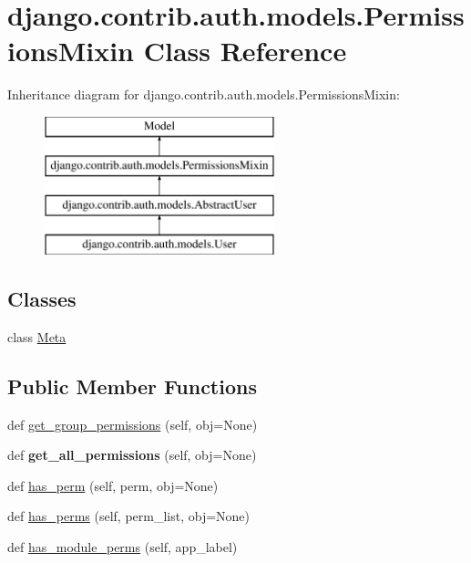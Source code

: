 \hypertarget{classdjango_1_1contrib_1_1auth_1_1models_1_1_permissions_mixin}{}\section{django.\+contrib.\+auth.\+models.\+Permissions\+Mixin Class Reference}
\label{classdjango_1_1contrib_1_1auth_1_1models_1_1_permissions_mixin}
Inheritance diagram for django.\+contrib.\+auth.\+models.\+Permissions\+Mixin\+:\begin{figure}[H]
\begin{center}
\leavevmode
\includegraphics[height=4.000000cm]{classdjango_1_1contrib_1_1auth_1_1models_1_1_permissions_mixin}
\end{center}
\end{figure}
\subsection*{Classes}
\begin{DoxyCompactItemize}
\item 
class \mbox{\hyperlink{classdjango_1_1contrib_1_1auth_1_1models_1_1_permissions_mixin_1_1_meta}{Meta}}
\end{DoxyCompactItemize}
\subsection*{Public Member Functions}
\begin{DoxyCompactItemize}
\item 
def \mbox{\hyperlink{classdjango_1_1contrib_1_1auth_1_1models_1_1_permissions_mixin_afb70bc966eb6e834f724c61d73e558c3}{get\+\_\+group\+\_\+permissions}} (self, obj=None)
\item 
\mbox{\label{classdjango_1_1contrib_1_1auth_1_1models_1_1_permissions_mixin_af27994a1d27c434a18810702c8073dfe}} 
def {\bfseries get\+\_\+all\+\_\+permissions} (self, obj=None)
\item 
def \mbox{\hyperlink{classdjango_1_1contrib_1_1auth_1_1models_1_1_permissions_mixin_a37141152b9d3fe8bfb73f593c000c430}{has\+\_\+perm}} (self, perm, obj=None)
\item 
def \mbox{\hyperlink{classdjango_1_1contrib_1_1auth_1_1models_1_1_permissions_mixin_ab3a72b420cd5ee2f27095ca4dd972497}{has\+\_\+perms}} (self, perm\+\_\+list, obj=None)
\item 
def \mbox{\hyperlink{classdjango_1_1contrib_1_1auth_1_1models_1_1_permissions_mixin_a110055fa639d65a637a1eae118b73b94}{has\+\_\+module\+\_\+perms}} (self, app\+\_\+label)
\end{DoxyCompactItemize}
